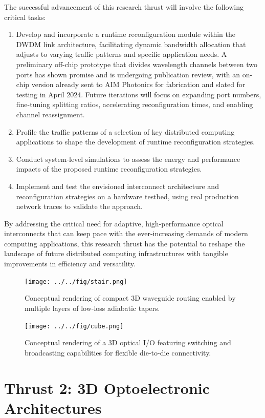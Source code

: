 The successful advancement of this research thrust will involve the following critical tasks:
\begin{enumerate}[nosep]
    \item Develop and incorporate a runtime reconfiguration module within the DWDM link architecture, facilitating dynamic bandwidth allocation that adjusts to varying traffic patterns and specific application needs. A preliminary off-chip prototype that divides wavelength channels between two ports has shown promise and is undergoing publication review, with an on-chip version already sent to AIM Photonics for fabrication and slated for testing in April 2024. Future iterations will focus on expanding port numbers, fine-tuning splitting ratios, accelerating reconfiguration times, and enabling channel reassignment.
    \item Profile the traffic patterns of a selection of key distributed computing applications to shape the development of runtime reconfiguration strategies.
    \item Conduct system-level simulations to assess the energy and performance impacts of the proposed runtime reconfiguration strategies.
    \item Implement and test the envisioned interconnect architecture and reconfiguration strategies on a hardware testbed, using real production network traces to validate the approach.
\end{enumerate}
By addressing the critical need for adaptive, high-performance optical interconnects that can keep pace with the ever-increasing demands of modern computing applications, this research thrust has the potential to reshape the landscape of future distributed computing infrastructures with tangible improvements in efficiency and versatility.

\begin{figure}[!ht]%
    \texttt{[image: ../../fig/stair.png]}
    \caption{Conceptual rendering of compact 3D waveguide routing enabled by multiple layers of low-loss adiabatic tapers.}
    \label{fig:stair}
\end{figure}
\begin{figure}[!ht]%
    \texttt{[image: ../../fig/cube.png]}
    \caption{Conceptual rendering of a 3D optical I/O featuring switching and broadcasting capabilities for flexible die-to-die connectivity.}
    \label{fig:cube}
\end{figure}

\section{Thrust 2: 3D Optoelectronic Architectures}

